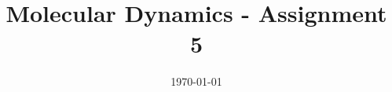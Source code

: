 %
% 
% 
%






\renewcommand{\PersonTitel}{}
\newcommand{\Datum}{\today}
\makeatletter
\newcommand\listofframes{\@starttoc{lbf}}
\makeatother

\usepackage{tikz}
\usetikzlibrary{decorations.pathreplacing}
\usetikzlibrary{angles, quotes}
\usetikzlibrary{shapes,arrows, positioning, calc}
\usepackage{amssymb}
\usepackage{graphicx}
\usepackage{multimedia}
\usepackage{centernot}

\usepackage{fancyvrb}
\usepackage{tabularx}
\usepackage{blindtext}
\usepackage{listings}

\newlength\myindent
\setlength\myindent{2em}

\renewcommand{\PraesentationFusszeileZusatz}{}%

\title{Molecular Dynamics - Assignment 5}
\author{\PersonVornameAl{} \PersonNachnameHo{} \and
	\PersonVornameJa{} \PersonNachnameHa{} \and
	\PersonVornameJo{} \PersonNachnameRi{} }
\institute[]{\UniversitaetName \\ \FakultaetName \\ \LehrstuhlName}
\date[\Datum]{\today}%
\subject{Thema der Präsentation}

